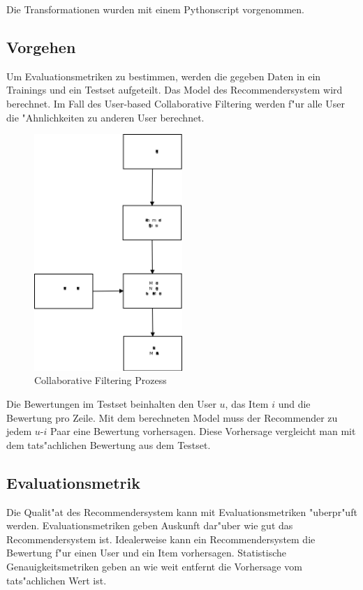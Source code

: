 \documentclass[a4paper, 12pt]{article}
\begin{document}
Die Transformationen wurden mit einem Pythonscript vorgenommen.

\subsection{Vorgehen}
\label{sec:procedure}

Um Evaluationsmetriken zu bestimmen, werden die gegeben Daten in ein Trainings und ein Testset aufgeteilt. Das Model des Recommendersystem wird berechnet. Im Fall des User-based Collaborative Filtering werden f"ur alle User die "Ahnlichkeiten zu anderen User berechnet.

\begin{figure}
  \centering
      \includegraphics[width=0.5\textwidth]{evaluation}
  \caption{Collaborative Filtering Prozess}
\end{figure}

Die Bewertungen im Testset beinhalten den User $u$, das Item $i$ und die Bewertung pro Zeile. Mit dem berechneten Model muss der Recommender zu jedem $u$-$i$ Paar eine Bewertung vorhersagen. Diese Vorhersage vergleicht man mit dem tats"achlichen Bewertung aus dem Testset.

\subsection{Evaluationsmetrik}
\label{sec:evaluationmetrik}

Die Qualit"at des Recommendersystem kann mit Evaluationsmetriken "uberpr"uft werden. Evaluationsmetriken geben Auskunft dar"uber wie gut das Recommendersystem ist. Idealerweise kann ein Recommendersystem die Bewertung f"ur einen User und ein Item vorhersagen. Statistische Genauigkeitsmetriken geben an wie weit entfernt die Vorhersage vom tats"achlichen Wert ist. 
\end{document}
